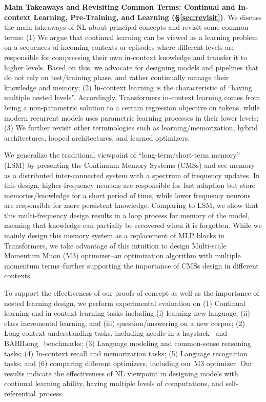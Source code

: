 \noindent
\textcolor{c5}{\textbf{Main Takeaways and Revisiting Common Terms: Continual and In-context Learning, Pre-Training, and Learning (\textcolor{black}{\S}\ref{sec:revisit})}.}
We discuss the main takeaways of NL about principal concepts and revisit some common terms: (1) We argue that continual learning can be viewed as a learning problem on a sequences of incoming contexts or episodes where different levels are responsible for compressing their own in-context knowledge and transfer it to higher levels. Based on this, we advocate for designing models and pipelines that do not rely on test/training phase, and rather continually manage their knowledge and memory; (2) In-context learning is the characteristic of ``having multiple nested levels''. Accordingly, Transformers in-context learning comes from  being a non-parametric solution to a certain regression objective on tokens, while modern recurrent models uses parametric learning processes in their lower levels; (3) We further revisit other terminologies such as learning/memorization, hybrid architectures, looped architectures, and learned optimizers.  



We generalize the traditional viewpoint of ``long-term/short-term memory'' (LSM) by presenting the Continuum Memory Systems (CMSs) and see memory as a distributed inter-connected system with a spectrum of frequency updates. In this design, higher-frequency neurons are responsible for fast adaption but store memories/knowledge for a short period of time, while lower frequency neurons are responsible for more persistent knowledge. Comparing to LSM, we show that this multi-frequency design results in a loop process for memory of the model, meaning that knowledge can partially be recovered when it is forgotten. While we mainly design this memory system as a replacement of MLP blocks in Transformers, we take advantage of this intuition to design Multi-scale Momentum Muon (M3) optimizer–an optimization algorithm with multiple momentum terms–further supporting the importance of CMSs design in different contexts. 




To support the effectiveness of our proofs-of-concept as well as the importance of nested learning design, we perform experimental evaluation on (1) Continual learning and in-context learning tasks including (i) learning new language, (ii) class incremental learning, and (iii) question/answering on a new corpus; (2) Long context understanding tasks, including needle-in-a-haystack~\citep{hsieh2024ruler} and BABILong~\citep{kuratov2024babilong} benchmarks; (3) Language modeling and common-sense reasoning tasks; (4) In-context recall  and memorization tasks; (5) Language recognition tasks; and (6) comparing different optimizers, including our M3 optimizer. Our results indicate the effectiveness of NL viewpoint in designing models with continual learning ability, having multiple levels of computations, and self-referential~process.       

